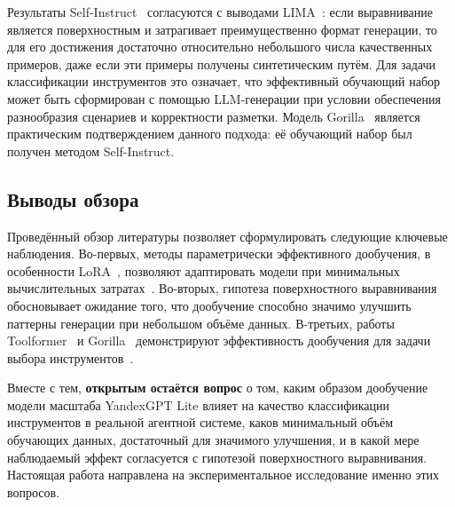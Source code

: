 Результаты Self-Instruct~\cite{wang2023selfinstruct} согласуются с выводами LIMA~\cite{zhou2023lima}: если выравнивание является поверхностным и затрагивает преимущественно формат генерации, то для его достижения достаточно относительно небольшого числа качественных примеров, даже если эти примеры получены синтетическим путём. Для задачи классификации инструментов это означает, что эффективный обучающий набор может быть сформирован с помощью LLM-генерации при условии обеспечения разнообразия сценариев и корректности разметки. Модель Gorilla~\cite{patil2023gorilla} является практическим подтверждением данного подхода: её обучающий набор был получен методом Self-Instruct.

\subsection{Выводы обзора}

Проведённый обзор литературы позволяет сформулировать следующие ключевые наблюдения. Во-первых, методы параметрически эффективного дообучения, в особенности LoRA~\cite{hu2022lora}, позволяют адаптировать модели при минимальных вычислительных затратах~\cite{ding2023parameter}. Во-вторых, гипотеза поверхностного выравнивания~\cite{zhou2023lima, gudibande2023false} обосновывает ожидание того, что дообучение способно значимо улучшить паттерны генерации при небольшом объёме данных. В-третьих, работы Toolformer~\cite{schick2023toolformer} и Gorilla~\cite{patil2023gorilla} демонстрируют эффективность дообучения для задачи выбора инструментов~\cite{xi2023rise, qin2024toollearning}.

Вместе с тем, \textbf{открытым остаётся вопрос} о том, каким образом дообучение модели масштаба YandexGPT Lite влияет на качество классификации инструментов в реальной агентной системе, каков минимальный объём обучающих данных, достаточный для значимого улучшения, и в какой мере наблюдаемый эффект согласуется с гипотезой поверхностного выравнивания. Настоящая работа направлена на экспериментальное исследование именно этих вопросов.
